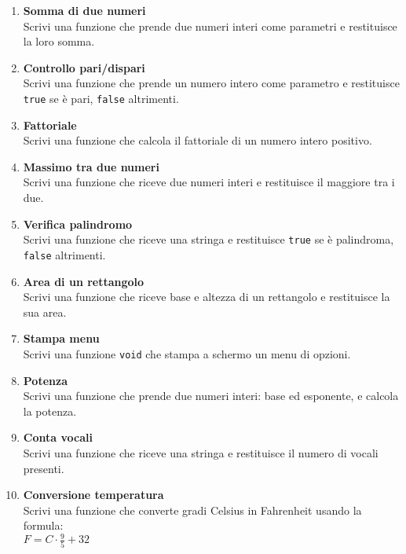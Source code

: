 \documentclass{article}
\begin{document}
\begin{enumerate}
    \item \textbf{Somma di due numeri} \\
    Scrivi una funzione che prende due numeri interi come parametri e restituisce la loro somma.

    \item \textbf{Controllo pari/dispari} \\
    Scrivi una funzione che prende un numero intero come parametro e restituisce \texttt{true} se è pari, \texttt{false} altrimenti.

    \item \textbf{Fattoriale} \\
    Scrivi una funzione che calcola il fattoriale di un numero intero positivo.

    \item \textbf{Massimo tra due numeri} \\
    Scrivi una funzione che riceve due numeri interi e restituisce il maggiore tra i due.

    \item \textbf{Verifica palindromo} \\
    Scrivi una funzione che riceve una stringa e restituisce \texttt{true} se è palindroma, \texttt{false} altrimenti.

    \item \textbf{Area di un rettangolo} \\
    Scrivi una funzione che riceve base e altezza di un rettangolo e restituisce la sua area.

    \item \textbf{Stampa menu} \\
    Scrivi una funzione \texttt{void} che stampa a schermo un menu di opzioni.

    \item \textbf{Potenza} \\
    Scrivi una funzione che prende due numeri interi: base ed esponente, e calcola la potenza.

    \item \textbf{Conta vocali} \\
    Scrivi una funzione che riceve una stringa e restituisce il numero di vocali presenti.

    \item \textbf{Conversione temperatura} \\
    Scrivi una funzione che converte gradi Celsius in Fahrenheit usando la formula: \\
    \quad $F = C \cdot \frac{9}{5} + 32$
\end{enumerate}
\end{document}
